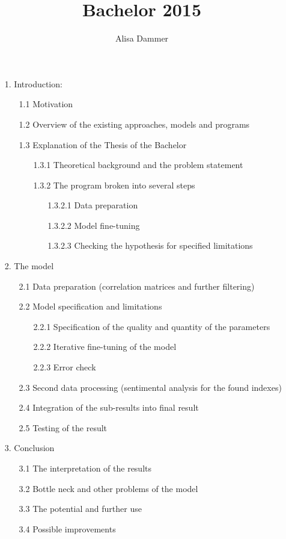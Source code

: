 \documentclass {article}
\title{Bachelor 2015}
\author{Alisa Dammer}
\begin{document}
\maketitle
 
\begin{enumerate}
	\item[1.] Introduction:
		\begin{enumerate}
			\item[1.1] Motivation
			\item[1.2] Overview of the existing approaches, models and programs
			\item[1.3] Explanation of the Thesis of the Bachelor
				\begin{enumerate}
					\item[1.3.1] Theoretical background and the problem statement
					\item[1.3.2] The program broken into several steps
						\begin{enumerate}
							\item[1.3.2.1] Data preparation
							\item[1.3.2.2] Model fine-tuning
							\item[1.3.2.3] Checking the hypothesis for specified limitations
						\end{enumerate}
				\end{enumerate} 
		\end{enumerate}
	\item[2.] The model
		\begin{enumerate}
			\item[2.1] Data preparation (correlation matrices and further filtering)
			\item[2.2] Model specification and limitations
				\begin{enumerate}
					\item[2.2.1] Specification of the quality and quantity of the parameters
					\item[2.2.2] Iterative fine-tuning of the model 
					\item[2.2.3] Error check
				\end{enumerate}
			\item[2.3] Second data processing (sentimental analysis for the found indexes)
			\item[2.4] Integration of the sub-results into final result
			\item[2.5] Testing of the result
		\end{enumerate}
	\item[3.] Conclusion
		\begin{enumerate}
			\item[3.1] The interpretation of the results
			\item[3.2] Bottle neck and other problems of the model
			\item[3.3] The potential and further use
			\item[3.4] Possible improvements
		\end{enumerate}
\end{enumerate}
\end{document}
